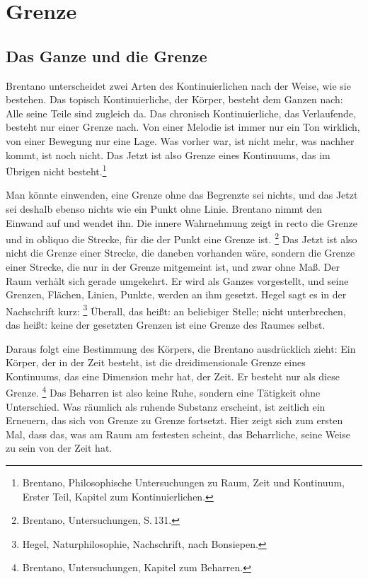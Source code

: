 \chapter{Grenze}

\section{Das Ganze und die Grenze}

Brentano unterscheidet zwei Arten des Kontinuierlichen nach der Weise, wie sie bestehen. Das topisch Kontinuierliche, der Körper, besteht dem Ganzen nach: Alle seine Teile sind zugleich da. Das chronisch Kontinuierliche, das Verlaufende, besteht nur einer Grenze nach. Von einer Melodie ist immer nur ein Ton wirklich, von einer Bewegung nur eine Lage. Was vorher war, ist nicht mehr, was nachher kommt, ist noch nicht. Das Jetzt ist also Grenze eines Kontinuums, das im Übrigen nicht besteht.\footnote{Brentano, Philosophische Untersuchungen zu Raum, Zeit und Kontinuum, Erster Teil, Kapitel zum Kontinuierlichen.}

Man könnte einwenden, eine Grenze ohne das Begrenzte sei nichts, und das Jetzt sei deshalb ebenso nichts wie ein Punkt ohne Linie. Brentano nimmt den Einwand auf und wendet ihn. Die innere Wahrnehmung zeigt in recto die Grenze und in obliquo die Strecke, für die der Punkt eine Grenze ist. \footnote{Brentano, Untersuchungen, S.\,131.} Das Jetzt ist also nicht die Grenze einer Strecke, die daneben vorhanden wäre, sondern die Grenze einer Strecke, die nur in der Grenze mitgemeint ist, und zwar ohne Maß. Der Raum verhält sich gerade umgekehrt. Er wird als Ganzes vorgestellt, und seine Grenzen, Flächen, Linien, Punkte, werden an ihm gesetzt. Hegel sagt es in der Nachschrift kurz: \footnote{Hegel, Naturphilosophie, Nachschrift, nach Bonsiepen.} Überall, das heißt: an beliebiger Stelle; nicht unterbrechen, das heißt: keine der gesetzten Grenzen ist eine Grenze des Raumes selbst.

Daraus folgt eine Bestimmung des Körpers, die Brentano ausdrücklich zieht: Ein Körper, der in der Zeit besteht, ist die dreidimensionale Grenze eines Kontinuums, das eine Dimension mehr hat, der Zeit. Er besteht nur als diese Grenze. \footnote{Brentano, Untersuchungen, Kapitel zum Beharren.} Das Beharren ist also keine Ruhe, sondern eine Tätigkeit ohne Unterschied. Was räumlich als ruhende Substanz erscheint, ist zeitlich ein Erneuern, das sich von Grenze zu Grenze fortsetzt. Hier zeigt sich zum ersten Mal, dass das, was am Raum am festesten scheint, das Beharrliche, seine Weise zu sein von der Zeit hat.

